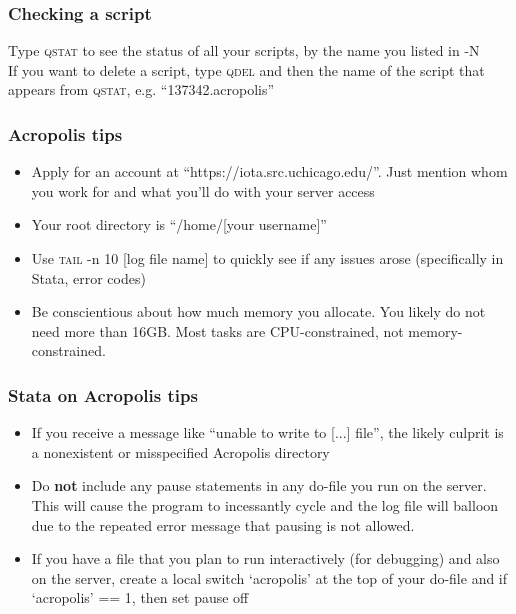 \documentclass{beamer}
\newcommand{\bi}{\begin{itemize}}
\newcommand{\ei}{\end{itemize}}
\begin{document}
\begin{frame}
	\frametitle{Checking a script}
	Type \textsc{qstat} to see the status of all your scripts, by the name you listed in -N
	\\[1em]
	\pause
	If you want to delete a script, type \textsc{qdel} and then the name of the script that appears from \textsc{qstat}, e.g. ``137342.acropolis''
\end{frame}

\begin{frame}
	\frametitle{Acropolis tips}
	\bi[<+>]
		\item Apply for an account at ``https://iota.src.uchicago.edu/''. Just mention whom you work for and what you'll do with your server access
		\item Your root directory is ``/home/[your username]''
		\item Use \textsc{tail} -n 10 [log file name] to quickly see if any issues arose (specifically in Stata, error codes)
		\item Be conscientious about how much memory you allocate. You likely do not need more than 16GB. Most tasks are CPU-constrained, not memory-constrained.
	\ei
\end{frame}

\begin{frame}
	\frametitle{Stata on Acropolis tips}
	\bi[<+>]
		\item If you receive a message like ``unable to write to [...] file'', the likely culprit is a nonexistent or misspecified Acropolis directory
		\item Do \textbf{not} include any pause statements in any do-file you run on the server. This will cause the program to incessantly cycle and the log file will balloon due to the repeated error message that pausing is not allowed. 
		\item If you have a file that you plan to run interactively (for debugging) and also on the server, create a local switch `acropolis' at the top of your do-file and if `acropolis' == 1, then set pause off
	\ei
\end{frame}
\end{document}
